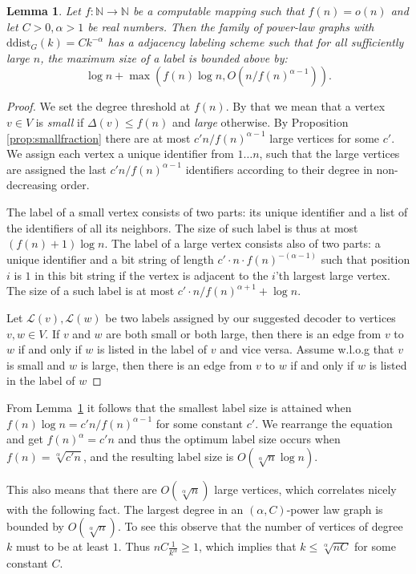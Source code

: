 \documentclass{article}
\newtheorem{lemma}{Lemma}
\theoremstyle{remark}
\newcommand{\la}{\ensuremath{ \mathcal{L}}}
\begin{document}
\begin{lemma}\label{lem:silly_bound}
Let $f : \mathbb{N} \longrightarrow \mathbb{N}$ be a computable mapping such that $f(n) = o(n)$
and let $C > 0, \alpha > 1$ be real numbers. Then the family of power-law graphs
with $\mathrm{ddist}_G(k) = C k^{-\alpha}$ has a adjacency labeling scheme
such that for all sufficiently large $n$, the maximum size of a label
is bounded above by:
$$\log n +\max(f(n) \log n   ,  O(n / f(n)^{\alpha -1})).$$
\end{lemma}

\begin{proof}
We set the degree threshold at $f(n)$. By that we mean that   a vertex $v \in V$ is \emph{small} if $\Delta(v) \leq f(n)$ and \emph{large} otherwise.
By Proposition \ref{prop:smallfraction} there are at most $c'n / f(n)^{\alpha -1}$ large  vertices for some $c'$.
We assign each vertex a unique identifier from $1 \dots n$, such that the large vertices are assigned the last $c' n / f(n)^{\alpha -1}$  identifiers according to their degree in non-decreasing order.

The label of a small vertex consists of two parts: its unique identifier and a list of the identifiers of all its neighbors.
The size of such label  is thus at  most  $(f(n)+1) \log n$.
The label of a large vertex consists also of two parts: a unique identifier and a bit string of length $c' \cdot  n \cdot f(n)^{-(\alpha -1)}$ such that  position $i$ is $1$ in this bit string if the vertex 
is adjacent to the $i$'th largest large vertex.
The size of a such  label is  at most $c' \cdot  n / f(n)^{\alpha +1}+ \log n.$

Let $\la(v), \la(w)$ be two labels assigned by our suggested decoder to  vertices $v,w \in V$.
 If $v$ and $w$ are both small or both large, then there is an edge from $v$ to $w$ if and only if $w$ is listed in the label of $v$ and vice versa.
 Assume w.l.o.g that $v$ is small and $w$ is large, then there is an edge from $v$ to $w$ if and only if $w$ is listed in the label of $w$
\end{proof}

From Lemma~\ref{lem:silly_bound} it follows that the smallest label size is attained when
$ f(n) \log n = c'n / f(n)^{\alpha -1}$ for some constant $c'$.
We rearrange the equation and get
$ f(n)^{\alpha} = c'n $ and thus the optimum label size occurs when $f(n) = \sqrt[\alpha]{c'n}$, and the resulting label size is  $O( \sqrt[\alpha]{n} \log n)$.
 
This also means that there are $O(\sqrt[\alpha]n)$ large vertices, which correlates nicely with the following fact.
The largest degree in an $(\alpha,C)$-power law graph is bounded by $O(\sqrt[\alpha]n)$.
To see this observe that the number of vertices of degree $k$ must  to be at least $1$. Thus 
$ nC\frac{1}{k^\alpha} \geq 1$, which implies that $k \leq \sqrt[\alpha]{nC}$ for some constant $C$.
\end{document}
